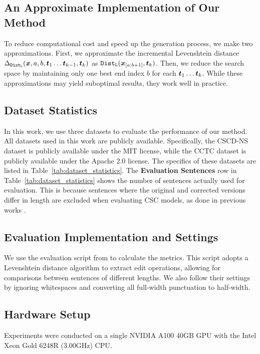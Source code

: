 \subsection{An Approximate Implementation of Our Method}
\label{subsec:approximate_implementation_of_our_method}
To reduce computational cost and speed up the generation process, we make two approximations.
First, we approximate the incremental Levenshtein distance $\Delta_{\mathtt{Dist}_{\mathtt{L}}}({\boldsymbol{x}}, a, b, {\boldsymbol{t}}_1\dots{\boldsymbol{t}}_{k-1}, {\boldsymbol{t}}_k)$ as $\mathtt{Dist}_{\mathtt{L}}({\boldsymbol{x}}_{[a:b+1]}, {\boldsymbol{t}}_k)$.
Then, we reduce the search space by maintaining only one best end index $b$ for each ${\boldsymbol{t}}_1\dots{\boldsymbol{t}}_k$.
While these approximations may yield suboptimal results, they work well in practice.

\subsection{Dataset Statistics}
\label{subsec:dataset_statistics}
In this work, we use three datasets to evaluate the performance of our method.
All datasets used in this work are publicly available.
Specifically, the CSCD-NS dataset is publicly available under the MIT license, while the CCTC dataset is publicly available under the Apache 2.0 license.
The specifics of these datasets are listed in Table~\ref{tab:dataset_statistics}.
The \textbf{Evaluation Sentences} row in Table~\ref{tab:dataset_statistics} shows the number of sentences actually used for evaluation.
This is because sentences where the original and corrected versions differ in length are excluded when evaluating CSC models, as done in previous works \cite{liu-etal-2023-chinese,li-etal-2024-cllm,zhou-etal-2024-simple}.

\subsection{Evaluation Implementation and Settings}
\label{subsec:evaluation_implementation_and_settings}
We use the evaluation script from \citet{zhou-etal-2024-simple} to calculate the metrics.
This script adopts a Levenshtein distance algorithm to extract edit operations, allowing for comparisons between sentences of different lengths.
We also follow their settings by ignoring whitespaces and converting all full-width punctuation to half-width.

\subsection{Hardware Setup}
Experiments were conducted on a single NVIDIA A100 40GB GPU with the Intel Xeon Gold 6248R (3.00GHz) CPU.

